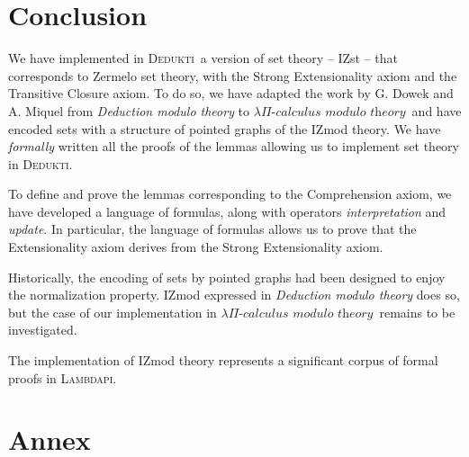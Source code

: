 \documentclass[submission,copyright,creativecommons]{eptcs}
\newcommand{\dedukti}{\textsc{Dedukti}}
\newcommand{\lpcm}{$\lambda \Pi\textit{-calculus modulo theory}$}
\begin{document}
\section{Conclusion}

We have implemented in \dedukti ~a version of set theory -- IZst -- that corresponds to Zermelo set theory, with the Strong Extensionality axiom and the Transitive Closure axiom. To do so, we have adapted the work by G. Dowek and A. Miquel \cite{zermodulo} from \textit{Deduction modulo theory} to \lpcm ~and have encoded sets with a structure of pointed graphs of the IZmod theory. We have \textit{formally} written all the proofs of the lemmas allowing us to implement set theory in \dedukti.

To define and prove the lemmas corresponding to the Comprehension axiom, we have developed a language of formulas, along with operators \textit{interpretation} and \textit{update}. In particular, the language of formulas allows us to prove that the Extensionality axiom derives from the Strong Extensionality axiom.

Historically, the encoding of sets by pointed graphs had been designed to enjoy the normalization property. IZmod expressed in \textit{Deduction modulo theory} does so, but the case of our implementation in \lpcm ~remains to be investigated.

The implementation of IZmod theory represents a significant corpus of formal proofs in \textsc{Lambdapi}.

\newpage
\section*{Annex}
\end{document}
